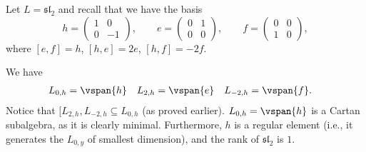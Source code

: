 Let $L = \mathfrak{sl}_2$ and recall that we have the basis
\[ h = \begin{pmatrix}1&0\\0&-1\end{pmatrix},\qquad e=\begin{pmatrix}0&1\\0&0\end{pmatrix},\qquad f=\begin{pmatrix}0&0\\1&0\end{pmatrix}, \]
where $[e, f] = h$, $[h, e] = 2e$, $[h, f] = -2f$.

We have
\begin{align*}
	L_{0, h} &= \vspan{h} & L_{2, h} &= \vspan{e} & L_{-2, h} &= \vspan{f}.
\end{align*}
Notice that $[L_{2, h}, L_{-2, h} \subseteq L_{0, h}$ (as proved earlier).
$L_{0, h} = \vspan{h}$ is a Cartan subalgebra, as it is clearly minimal.
Furthermore, $h$ is a regular element (i.e., it generates the $L_{0, y}$ of
smallest dimension), and the rank of $\mathfrak{sl}_2$ is $1$.
